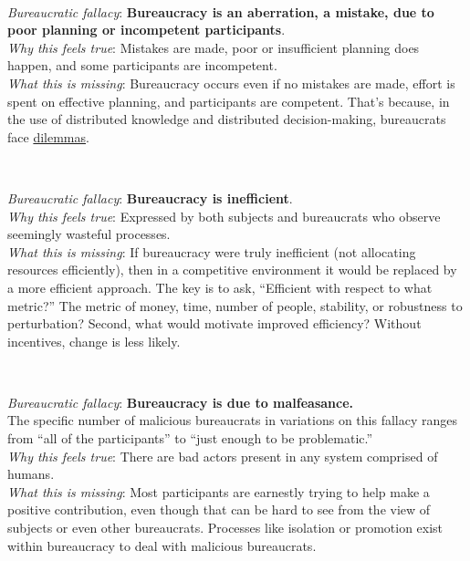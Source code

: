 \ \\
\begin{samepage}
\textit{Bureaucratic fallacy}: \textbf{Bureaucracy is an aberration, a mistake, due to poor planning or incompetent participants}. \\
\textit{Why this feels true}: Mistakes are made, poor or insufficient planning does happen, and some participants are incompetent.\\
\textit{What this is missing}: Bureaucracy occurs even if no mistakes are made, effort is spent on effective planning, and participants are competent. That's because, in the use of distributed knowledge and distributed decision-making, bureaucrats face \hyperref[sec:dilemma-trilemma]{dilemmas}.%
\end{samepage}

\ \\
\begin{samepage}
\textit{Bureaucratic fallacy}: \textbf{Bureaucracy is inefficient}. \\
\textit{Why this feels true}: Expressed by both subjects and bureaucrats who observe seemingly wasteful processes.\\
\textit{What this is missing}: If bureaucracy were truly inefficient (not allocating resources efficiently), then in a competitive environment it would be replaced by a more efficient approach. The key is to ask, ``Efficient with respect to what metric?'' The metric of money, time, number of people, stability, or robustness to perturbation?  Second, what would motivate improved efficiency? Without incentives, change is less likely. 
\end{samepage}

\ \\
\begin{samepage}
\textit{Bureaucratic fallacy}: \textbf{Bureaucracy is due to malfeasance.}\\
The specific number of malicious bureaucrats in variations on this fallacy ranges from ``all of the participants'' to ``just enough to be problematic.'' \\
\textit{Why this feels true}: There are bad actors present in any system comprised of humans. \\
\textit{What this is missing}: Most participants are earnestly trying to help make a positive contribution, even though that can be hard to see from the view of subjects or even other bureaucrats. Processes like isolation or promotion exist within bureaucracy to deal with malicious bureaucrats.
\end{samepage}

